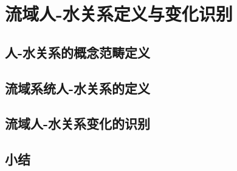 \chapter{流域人-水关系定义与变化识别}\label{ch2:preface}


\section{人-水关系的概念范畴定义}\label{ch2:scope}


\section{流域系统人-水关系的定义}\label{ch2:definitions}


\section{流域人-水关系变化的识别}\label{ch2:dynamic}


\section{小结}\label{ch2:summary}

